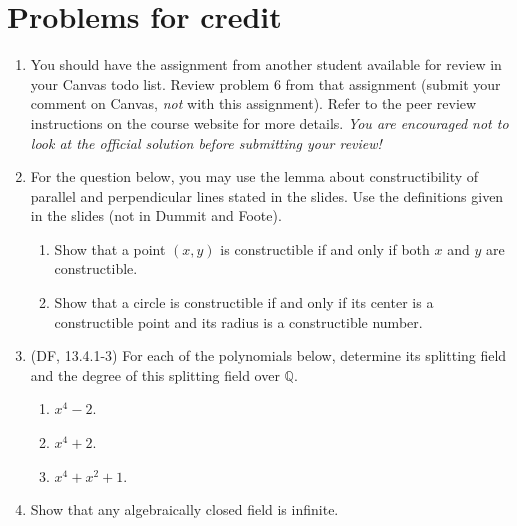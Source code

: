 \documentclass{amsart}
\theoremstyle{definition}
\newcommand{\Qq}{\mathbb{Q}}
\begin{document}
\section*{Problems for credit}
\begin{enumerate}
\item You should have the assignment from another student available for review in your Canvas todo list. Review problem 6 from that assignment (submit your comment on Canvas, \emph{not} with this assignment). Refer to the peer review instructions on the course website for more details. \emph{You are encouraged not to look at the official solution before submitting your review!}
\item For the question below, you may use the lemma about constructibility of parallel and perpendicular lines stated in the slides. Use the definitions given in the slides (not in Dummit and Foote).
  \begin{enumerate}
  \item Show that a point $(x, y)$ is constructible if and only if both $x$ and $y$ are constructible.
  \item Show that a circle is constructible if and only if its center is a constructible point and its radius is a constructible number.
  \end{enumerate}
\item (DF, 13.4.1-3) For each of the polynomials below, determine its splitting field and the degree of this splitting field over $\Qq$.
  \begin{enumerate}
  \item $x^4 - 2$.
  \item $x^4 + 2$.
  \item $x^4 + x^2 + 1$.
  \end{enumerate}
\item Show that any algebraically closed field is infinite.
\end{enumerate}
\end{document}
